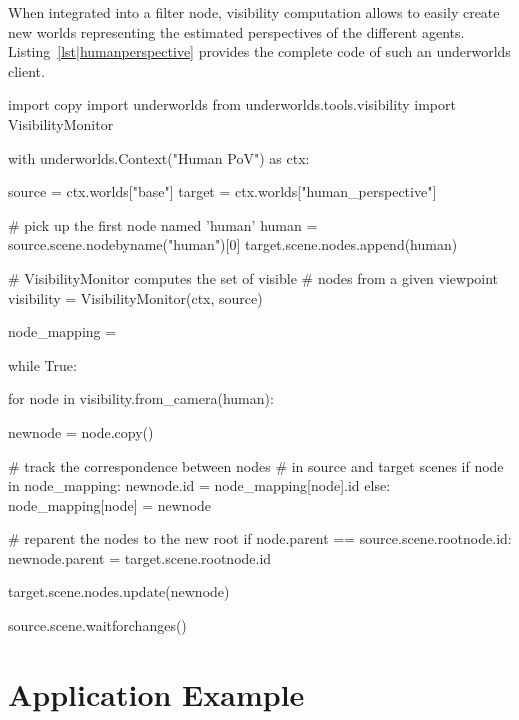 \documentclass[letterpaper, 10 pt, conference]{ieeeconf}  %
\newcommand{\uwds}{{\sc underworlds}\xspace}
\begin{document}
When integrated into a filter node, visibility computation allows to easily
create new worlds representing the estimated perspectives of the different
agents. Listing~\ref{lst|humanperspective} provides the complete code of such an
\uwds client.


\begin{listing}[h!]
\begin{pythoncode}
import copy
import underworlds
from underworlds.tools.visibility import VisibilityMonitor

with underworlds.Context("Human PoV") as ctx:

    source = ctx.worlds["base"]
    target = ctx.worlds["human_perspective"]

    # pick up the first node named 'human'
    human = source.scene.nodebyname("human")[0]
    target.scene.nodes.append(human)

    # VisibilityMonitor computes the set of visible 
    # nodes from a given viewpoint
    visibility = VisibilityMonitor(ctx, source)

    node_mapping = {}

    while True:

        for node in visibility.from_camera(human):

            newnode = node.copy()

            # track the correspondence between nodes
            # in source and target scenes
            if node in node_mapping:
                newnode.id = node_mapping[node].id
            else:
                node_mapping[node] = newnode

            # reparent the nodes to the new root
            if node.parent == source.scene.rootnode.id:
                newnode.parent = target.scene.rootnode.id

            target.scene.nodes.update(newnode)

        source.scene.waitforchanges()

\end{pythoncode}
    \caption{Example of an \uwds client that creates a world named {\tt
    human\_perspective} from a source world {\tt base} by only updating objects
    that are in the field of view of the human. As such, {\tt human\_perspective} is
    a real-time model of the human perspective on the scene.}

    \label{lst|humanperspective}
\end{listing}


\section{Application Example}
\end{document}
